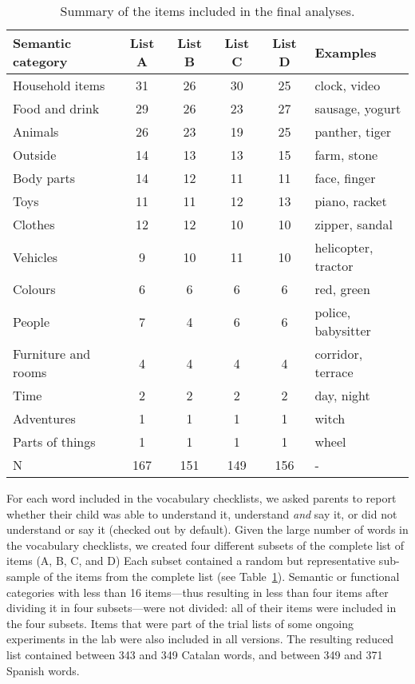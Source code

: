 \documentclass[
]{article}
\begin{document}
\hypertarget{tbl-items}{}
\begin{table}
\caption{\label{tbl-items}Summary of the items included in the final analyses. }\tabularnewline

\centering
\begin{tabular}{lccccl}
\toprule
Semantic category & List A & List B & List C & List D & Examples\\
\midrule
Household items & 31 & 26 & 30 & 25 & clock, video\\
Food and drink & 29 & 26 & 23 & 27 & sausage, yogurt\\
Animals & 26 & 23 & 19 & 25 & panther, tiger\\
Outside & 14 & 13 & 13 & 15 & farm, stone\\
Body parts & 14 & 12 & 11 & 11 & face, finger\\
\addlinespace
Toys & 11 & 11 & 12 & 13 & piano, racket\\
Clothes & 12 & 12 & 10 & 10 & zipper, sandal\\
Vehicles & 9 & 10 & 11 & 10 & helicopter, tractor\\
Colours & 6 & 6 & 6 & 6 & red, green\\
People & 7 & 4 & 6 & 6 & police, babysitter\\
\addlinespace
Furniture and rooms & 4 & 4 & 4 & 4 & corridor, terrace\\
Time & 2 & 2 & 2 & 2 & day, night\\
Adventures & 1 & 1 & 1 & 1 & witch\\
Parts of things & 1 & 1 & 1 & 1 & wheel\\
\midrule
N & 167 & 151 & 149 & 156 & -\\
\bottomrule
\end{tabular}
\end{table}

For each word included in the vocabulary checklists, we asked parents to
report whether their child was able to understand it, understand
\emph{and} say it, or did not understand or say it (checked out by
default). Given the large number of words in the vocabulary checklists,
we created four different subsets of the complete list of items (A, B,
C, and D) Each subset contained a random but representative sub-sample
of the items from the complete list (see Table~\ref{tbl-items}).
Semantic or functional categories with less than 16 items---thus
resulting in less than four items after dividing it in four
subsets---were not divided: all of their items were included in the four
subsets. Items that were part of the trial lists of some ongoing
experiments in the lab were also included in all versions. The resulting
reduced list contained between 343 and 349 Catalan words, and between
349 and 371 Spanish words.
\end{document}
